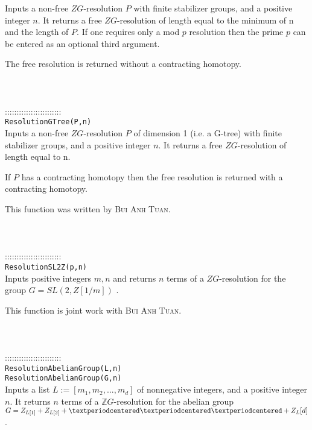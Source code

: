 \documentclass[a4paper,11pt]{report}
\begin{document}
{ Inputs a non-free $ZG$-resolution $P$ with finite stabilizer groups, and a positive integer $n$. It returns a free $ZG$-resolution of length equal to the minimum of n and the length of $P$. If one requires only a mod $p$ resolution then the prime $p$ can be entered as an optional third argument. 

 The free resolution is returned without a contracting homotopy. \\
 \\
 \\
 \\
 ::::::::::::::::::::::::\\
 \texttt{ResolutionGTree(P,n)}\\
 

 Inputs a non-free $ZG$-resolution $P$ of dimension 1 (i.e. a G-tree) with finite stabilizer groups, and a positive
integer $n$. It returns a free $ZG$-resolution of length equal to n. 

 If $P$ has a contracting homotopy then the free resolution is returned with a
contracting homotopy. 

 This function was written by \textsc{ Bui Anh Tuan}. \\
 \\
 \\
 \\
 ::::::::::::::::::::::::\\
 \texttt{ResolutionSL2Z(p,n)}\\
 

 Inputs positive integers $m, n$ and returns $n$ terms of a $ZG$-resolution for the group $G=SL(2,Z[1/m])$ . 

 

 This function is joint work with \textsc{Bui Anh Tuan}. \\
 \\
 \\
 \\
 ::::::::::::::::::::::::\\
 \texttt{ResolutionAbelianGroup(L,n)}\\
 \texttt{ResolutionAbelianGroup(G,n)}\\
 

 Inputs a list $L:=[m_1,m_2, ..., m_d]$ of nonnegative integers, and a positive integer $n$. It returns $n$ terms of a ${\mathbb Z}G$-resolution for the abelian group $G=Z_{L[1]}+Z_{L[2]}+{\textperiodcentered}{\textperiodcentered}{\textperiodcentered}+{Z_L[d]}$ . 

}
\end{document}

